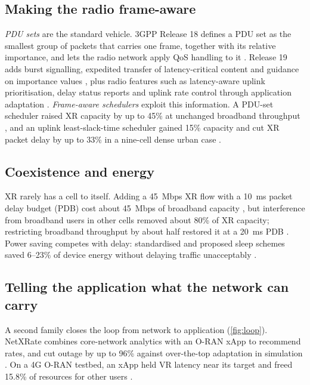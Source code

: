 \subsection{Making the radio frame-aware}
\emph{PDU sets} are the standard vehicle. 3GPP Release 18 defines a PDU set as the smallest group of
packets that carries one frame, together with its relative importance, and lets the radio network apply
QoS handling to it \cite{W4410582180}. Release 19 adds burst signalling, expedited transfer of
latency-critical content and guidance on importance values \cite{W7127418717}, plus radio features such
as latency-aware uplink prioritisation, delay status reports and uplink rate control through application
adaptation \cite{W7164211432}. \emph{Frame-aware schedulers} exploit this information. A PDU-set scheduler
raised XR capacity by up to 45\% at unchanged broadband throughput \cite{W4402156740}, and an uplink
least-slack-time scheduler gained 15\% capacity and cut XR packet delay by up to 33\% in a nine-cell dense
urban case \cite{W4406264804}.

\subsection{Coexistence and energy}
XR rarely has a cell to itself. Adding a 45~Mbps XR flow with a 10~ms packet delay budget (PDB) cost about
45~Mbps of broadband capacity \cite{W4385801627}, but interference from broadband users in other cells
removed about 80\% of XR capacity; restricting broadband throughput by about half restored it at a 20~ms
PDB \cite{W4387546593}. Power saving competes with delay: standardised and proposed sleep schemes saved
6--23\% of device energy without delaying traffic unacceptably \cite{W4406265335}.

\subsection{Telling the application what the network can carry}
A second family closes the loop from network to application (\cref{fig:loop}). NetXRate combines
core-network analytics with an O-RAN xApp to recommend rates, and cut outage by up to 96\% against
over-the-top adaptation in simulation \cite{W7161282618}. On a 4G O-RAN testbed, an xApp held VR latency
near its target and freed 15.8\% of resources for other users \cite{W4392175446}.


